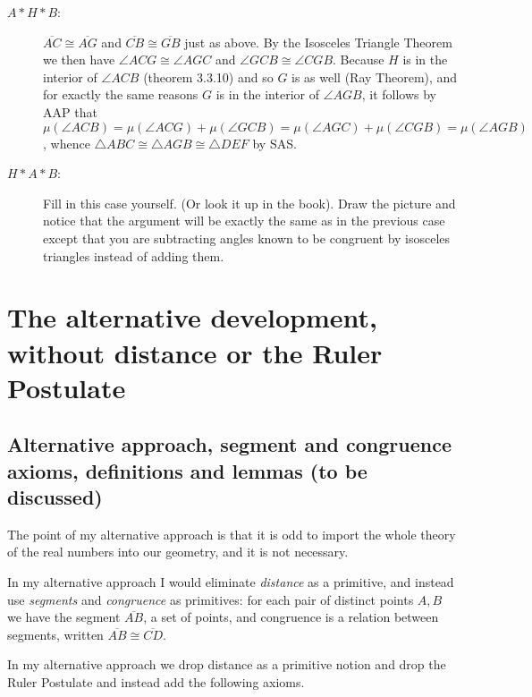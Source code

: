 \documentclass[12pt]{article}
\begin{document}
\begin{description}
\begin{description}
\item[$A*H*B$:]  $\overline{AC}\cong \overline{AG}$ and $\overline{CB} \cong \overline{GB}$ just as above.  By the Isosceles Triangle Theorem we then have
$\angle ACG \cong \angle AGC$ and $\angle GCB \cong \angle CGB$.   Because $H$ is in the interior of $\angle{ACB}$ (theorem 3.3.10) and so $G$ is as well (Ray Theorem), and for exactly the same reasons $G$ is in the interior of $\angle AGB$,  it follows by AAP that
$\mu(\angle ACB) = \mu(\angle ACG) + \mu(\angle GCB) = \mu(\angle AGC) + \mu(\angle CGB)  = \mu(\angle AGB)$, whence $\triangle{ABC} \cong \triangle{AGB} \cong \triangle DEF$ by SAS.

\item[$H*A*B$:]  Fill in this case yourself.  (Or look it up in the book).  Draw the picture and notice that the argument will be exactly the same as in the previous case
except that you are subtracting angles known to be congruent by isosceles triangles instead of adding them.


\end{description}



\end{description}


\section{The alternative development, without distance or the Ruler Postulate}

\subsection{Alternative approach, segment and congruence axioms, definitions and lemmas (to be discussed)}

The point of my alternative approach is that it is odd to import the whole theory of the real numbers into our geometry, and it is not necessary.

In my alternative approach I would eliminate {\em distance\/} as a primitive, and instead use {\em segments} and {\em congruence\/} as primitives:  for each pair of distinct points $A,B$ we have the segment $\overline{AB}$, a set of points, and congruence is a relation between segments, written $\overline{AB} \cong \overline{CD}$.

In my alternative approach we drop distance as a primitive notion and drop the Ruler Postulate and instead add the following axioms.
\end{document}
